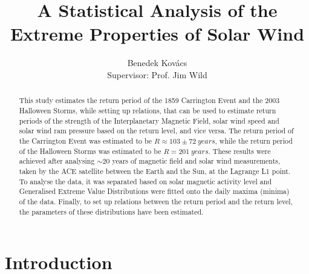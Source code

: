 \documentclass[12pt]{article}
\title{\vspace{-1em}A Statistical Analysis of the Extreme Properties of Solar Wind}
\author{Benedek Kovács\\ Supervisor: Prof. Jim Wild}
\date{}
\begin{document}
\maketitle
\begin{center}
\end{center}
\bigskip
\begin{abstract}
    \noindent This study estimates the return period of the 1859 Carrington Event and the 2003 Halloween Storms, while setting up relations, that can be used to estimate return periods of the strength of the Interplanetary Magnetic Field, solar wind speed and solar wind ram pressure based on the return level, and vice versa. The return period of the Carrington Event was estimated to be $R\approx 103\pm72\ years$, while the return period of the Halloween Storms was estimated to be $R=201\ years$. These results were achieved after analysing $\sim 20$ years of magnetic field and solar wind measurements, taken by the ACE satellite between the Earth and the Sun, at the Lagrange L1 point. To analyse the data, it was separated based on solar magnetic activity level and Generalised Extreme Value Distributions were fitted onto the daily maxima (minima) of the data. Finally, to set up relations between the return period and the return level, the parameters of these distributions have been estimated.
\end{abstract}
\newpage
\restoregeometry
\tableofcontents
\newpage
{}

\section{Introduction}\label{sec:introduction}
\end{document}
